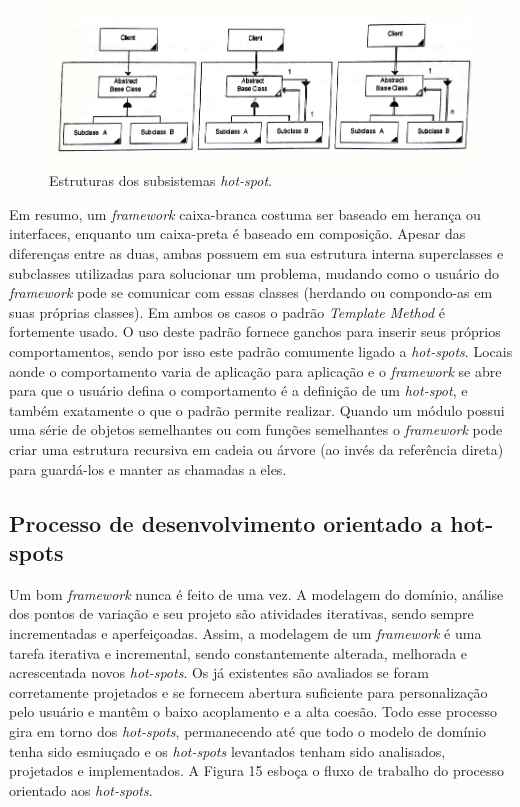 \begin{figure}[h]
	\centering
	\label{fig14}
		\includegraphics[keepaspectratio=true,scale=0.4]{figuras/subsistemaHotspot.jpg}
	\caption{Estruturas dos subsistemas \textit{hot-spot}. \cite{Fayad1999}}
\end{figure}

Em resumo, um \textit{framework} caixa-branca costuma ser baseado em herança ou interfaces, enquanto um caixa-preta é baseado em composição. Apesar das diferenças entre as duas, ambas possuem em sua estrutura interna superclasses e subclasses utilizadas para solucionar um problema, mudando como o usuário do \textit{framework} pode se comunicar com essas classes (herdando ou compondo-as em suas próprias classes). Em ambos os casos o padrão \textit{Template Method} é fortemente usado. O uso deste padrão fornece ganchos para inserir seus próprios comportamentos, sendo por isso este padrão comumente ligado a \textit{hot-spots}. Locais aonde o comportamento varia de aplicação para aplicação e o \textit{framework} se abre para que o usuário defina o comportamento é a definição de um \textit{hot-spot}, e também exatamente o que o padrão permite realizar. Quando um módulo possui uma série de objetos semelhantes ou com funções semelhantes o \textit{framework} pode criar uma estrutura recursiva em cadeia ou árvore (ao invés da referência direta) para guardá-los e manter as chamadas a eles.

\subsection{Processo de desenvolvimento orientado a hot-spots}

Um bom \textit{framework} nunca é feito de uma vez. A modelagem do domínio, análise dos pontos de variação e seu projeto são atividades iterativas, sendo sempre incrementadas e aperfeiçoadas. Assim, a modelagem de um \textit{framework} é uma tarefa iterativa e incremental, sendo constantemente alterada, melhorada e acrescentada novos \textit{hot-spots}. Os já existentes são avaliados se foram corretamente projetados e se fornecem abertura suficiente para personalização pelo usuário e mantêm o baixo acoplamento e a alta coesão. Todo esse processo gira em torno dos \textit{hot-spots}, permanecendo até que todo o modelo de domínio tenha sido esmiuçado e os \textit{hot-spots} levantados tenham sido analisados, projetados e implementados. A Figura 15 esboça o fluxo de trabalho do processo orientado aos \textit{hot-spots}.

